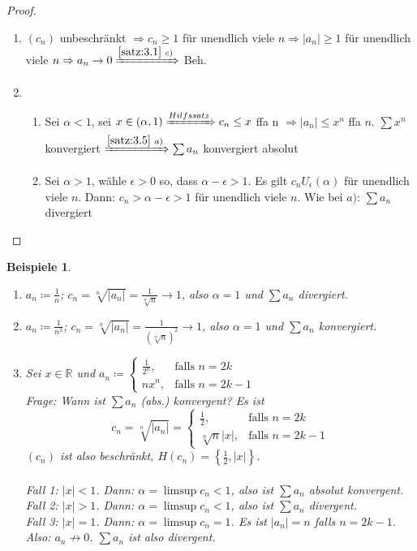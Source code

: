 \documentclass[titlepage,ngerman,a4paper,headsepline,DIV15,halfparskip*,14pt]{scrartcl}
\newcommand{\R}{\mathbb{R}}
\theoremstyle{dotless}
\newtheorem*{beispiele}{Beispiele}
\begin{document}
\begin{proof} ~\
	\begin{enumerate}
		\item $(c_{n})$ unbeschränkt $\Rightarrow c_{n} \geq 1$ für unendlich viele $n \Rightarrow |a_{n}| \geq 1$ für unendlich viele $n \Rightarrow a_{n} \rightarrow 0 \xRightarrow[]{\ref{satz:3.1}~c)}$ Beh.
		\item  %
			\begin{enumerate}
				\item Sei $\alpha < 1$, sei $x \in (\alpha, 1) \xRightarrow[]{Hilfssatz} c_{n} \leq x$ ffa n $\Rightarrow |a_{n}| \leq x^{n}$ ffa $n$. $\sum x^{n}$ konvergiert $\xRightarrow[]{\ref{satz:3.5}~a)} \sum a_{n}$ konvergiert absolut 
				\item Sei $\alpha > 1$, wähle $\epsilon > 0$ so, dass $\alpha - \epsilon > 1$. Es gilt $c_{n} U_{\epsilon}(\alpha)$ für unendlich viele $n$. Dann: $c_{n} > \alpha - \epsilon > 1$ für unendlich viele $n$. Wie bei $a)$: $\sum a_{n}$ divergiert 
			\end{enumerate}
	\end{enumerate}
\end{proof}


\begin{beispiele} ~\
	\begin{enumerate}
		\item $a_{n} \coloneqq \frac{1}{n}$; $c_{n} = \sqrt[n]{|a_{n}|} = \frac{1}{\sqrt[n]{n}} \rightarrow 1$, also $\alpha = 1$ und $\sum a_{n}$ divergiert.
		\item $a_{n} \coloneqq \frac{1}{n^{2}}$; $c_{n} = \sqrt[n]{|a_{n}|} = \frac{1}{(\sqrt[n]{n})^{2}} \rightarrow 1$, also $\alpha = 1$ und $\sum a_{n}$ konvergiert.
		\item Sei $x \in \R$ und $a_{n} \coloneqq \begin{cases} \frac{1}{2^{n}}, & \text{falls } n = 2k \\ n x^{n}, & \text{falls } n = 2k - 1 \end{cases}$ \\
			Frage: Wann ist $\sum a_{n}$ (abs.) konvergent? Es ist
			$$c_{n} = \sqrt[n]{|a_{n}|} = \begin{cases}
				\frac{1}{2}, & \text{falls } n = 2k \\ \sqrt[n]{n}|x|, & \text{falls } n = 2k - 1
			\end{cases}$$
			$(c_{n})$ ist also beschränkt, $H(c_{n}) = \left\{ \frac{1}{2}, |x| \right\}$. \\ \\
			Fall 1: $|x| < 1$. Dann: $\alpha = \limsup c_{n} < 1$, also ist $\sum a_{n}$ absolut konvergent. \\
			Fall 2: $|x| > 1$. Dann: $\alpha = \limsup c_{n} < 1$, also ist $\sum a_{n}$ divergent. \\
			Fall 3: $|x| = 1$. Dann: $\alpha = \limsup c_{n} = 1$. Es ist $|a_{n}| = n$ falls $n = 2k - 1$. Also: $a_{n} \not\rightarrow 0$. $\sum a_{n}$ ist also divergent.			
	\end{enumerate}	
\end{beispiele}
\end{document}
